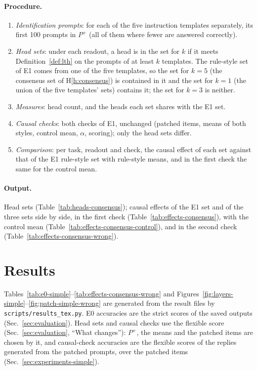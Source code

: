 \documentclass[11pt,a4paper]{article}
\begin{document}
\paragraph{Procedure.}
\begin{enumerate}
\item \emph{Identification prompts}: for each of the five instruction templates separately, its first 100 prompts in $P^{+}$ (all of them where fewer are answered correctly).
\item \emph{Head sets}: under each readout, a head is in the set for $k$ if it meets Definition~\ref{def:lth} on the prompts of at least $k$ templates. The rule-style set of E1 comes from one of the five templates, so the set for $k=5$ (the consensus set of H\ref{h:consensus}) is contained in it and the set for $k=1$ (the union of the five templates' sets) contains it; the set for $k=3$ is neither.
\item \emph{Measures}: head count, and the heads each set shares with the E1 set.
\item \emph{Causal checks}: both checks of E1, unchanged (patched items, means of both styles, control mean, $\alpha$, scoring); only the head sets differ.
\item \emph{Comparison}: per task, readout and check, the causal effect of each set against that of the E1 rule-style set with rule-style means, and in the first check the same for the control mean.
\end{enumerate}

\paragraph{Output.} Head sets (Table~\ref{tab:heads-consensus}); causal effects of the E1 set and of the three sets side by side, in the first check (Table~\ref{tab:effects-consensus}), with the control mean (Table~\ref{tab:effects-consensus-control}), and in the second check (Table~\ref{tab:effects-consensus-wrong}).

\section{Results}\label{sec:results-simple}
Tables~\ref{tab:e0-simple}--\ref{tab:effects-consensus-wrong} and Figures~\ref{fig:layers-simple}--\ref{fig:patch-simple-wrong} are generated from the result files by \texttt{scripts/results\_tex.py}. E0 accuracies are the strict scores of the saved outputs (Sec.~\ref{sec:evaluation}). Head sets and causal checks use the flexible score (Sec.~\ref{sec:evaluation}, ``What changes''): $P^{+}$, the means and the patched items are chosen by it, and causal-check accuracies are the flexible scores of the replies generated from the patched prompts, over the patched items (Sec.~\ref{sec:experiments-simple}).
\end{document}
